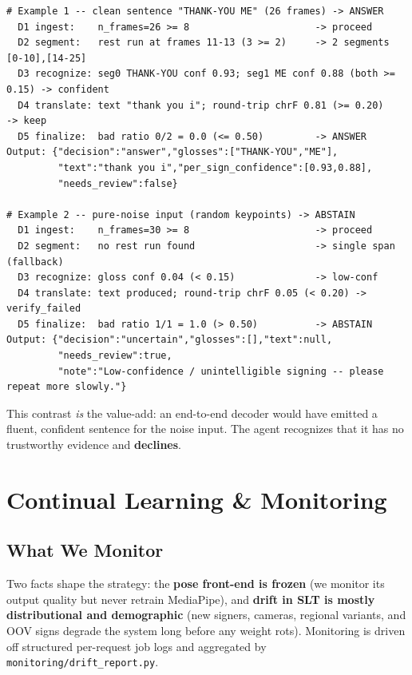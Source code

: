 \documentclass[12pt,a4paper]{article}
\begin{document}
\begin{lstlisting}
# Example 1 -- clean sentence "THANK-YOU ME" (26 frames) -> ANSWER
  D1 ingest:    n_frames=26 >= 8                      -> proceed
  D2 segment:   rest run at frames 11-13 (3 >= 2)     -> 2 segments [0-10],[14-25]
  D3 recognize: seg0 THANK-YOU conf 0.93; seg1 ME conf 0.88 (both >= 0.15) -> confident
  D4 translate: text "thank you i"; round-trip chrF 0.81 (>= 0.20)        -> keep
  D5 finalize:  bad ratio 0/2 = 0.0 (<= 0.50)         -> ANSWER
Output: {"decision":"answer","glosses":["THANK-YOU","ME"],
         "text":"thank you i","per_sign_confidence":[0.93,0.88],
         "needs_review":false}

# Example 2 -- pure-noise input (random keypoints) -> ABSTAIN
  D1 ingest:    n_frames=30 >= 8                      -> proceed
  D2 segment:   no rest run found                     -> single span (fallback)
  D3 recognize: gloss conf 0.04 (< 0.15)              -> low-conf
  D4 translate: text produced; round-trip chrF 0.05 (< 0.20) -> verify_failed
  D5 finalize:  bad ratio 1/1 = 1.0 (> 0.50)          -> ABSTAIN
Output: {"decision":"uncertain","glosses":[],"text":null,
         "needs_review":true,
         "note":"Low-confidence / unintelligible signing -- please repeat more slowly."}
\end{lstlisting}

This contrast \emph{is} the value-add: an end-to-end decoder would have emitted a fluent, confident sentence for the noise input. The agent recognizes that it has no trustworthy evidence and \textbf{declines}.

\section{Continual Learning \& Monitoring}

\subsection{What We Monitor}

Two facts shape the strategy: the \textbf{pose front-end is frozen} (we monitor its output quality but never retrain MediaPipe), and \textbf{drift in SLT is mostly distributional and demographic} (new signers, cameras, regional variants, and OOV signs degrade the system long before any weight rots). Monitoring is driven off structured per-request job logs and aggregated by \texttt{monitoring/drift\_report.py}.
\end{document}
